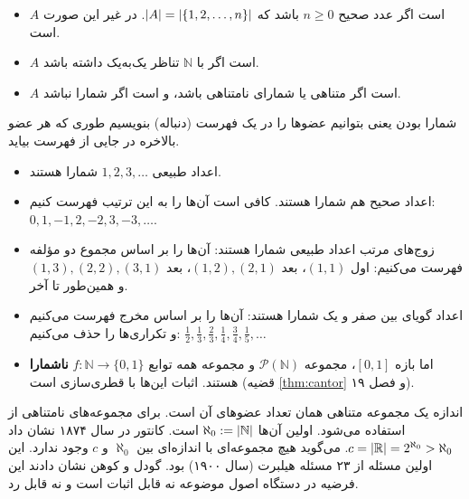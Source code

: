 \begin{definition}
\begin{itemize}
\item $A$  است اگر عدد صحیح $n\ge0$ باشد که $\lvert A\rvert=\lvert \{1,2,\dots,n\}\rvert$. در غیر این صورت  است.
\item $A$  است اگر با $\mathbb{N}$ تناظر یک‌به‌یک داشته باشد.
\item $A$  است اگر متناهی یا شمارای نامتناهی باشد، و  است اگر شمارا نباشد.
\end{itemize}
\end{definition}

شمارا بودن یعنی بتوانیم عضوها را در یک فهرست (دنباله) بنویسیم طوری که هر عضو بالاخره در جایی از فهرست بیاید.

\begin{example}
\begin{itemize}
\item اعداد طبیعی $1,2,3,\dots$ شمارا هستند.
\item اعداد صحیح هم شمارا هستند. کافی است آن‌ها را به این ترتیب فهرست کنیم: $0,1,-1,2,-2,3,-3,\dots$.
\item زوج‌های مرتب اعداد طبیعی شمارا هستند: آن‌ها را بر اساس مجموع دو مؤلفه فهرست می‌کنیم: اول $(1,1)$، بعد $(1,2),(2,1)$، بعد $(1,3),(2,2),(3,1)$ و همین‌طور تا آخر.
\item اعداد گویای بین صفر و یک شمارا هستند: آن‌ها را بر اساس مخرج فهرست می‌کنیم و تکراری‌ها را حذف می‌کنیم: $\tfrac12,\tfrac13,\tfrac23,\tfrac14,\tfrac34,\tfrac15,\dots$
\item اما بازه $[0,1]$، مجموعه $\mathcal{P}(\mathbb{N})$ و مجموعه همه توابع $f:\mathbb{N}\to\{0,1\}$ \textbf{ناشمارا} هستند. اثبات این‌ها با قطری‌سازی است (قضیه \ref{thm:cantor} و فصل ۱۹).
\end{itemize}
\end{example}

\begin{note}
اندازه یک مجموعه متناهی همان تعداد عضوهای آن است. برای مجموعه‌های نامتناهی از  استفاده می‌شود. اولین آن‌ها $\aleph_0:=\lvert \mathbb{N}\rvert$ است. کانتور در سال ۱۸۷۴ نشان داد $c=\lvert \mathbb{R}\rvert=2^{\aleph_0}>\aleph_0$.  می‌گوید هیچ مجموعه‌ای با اندازه‌ای بین $\aleph_0$ و $c$ وجود ندارد. این اولین مسئله از ۲۳ مسئله هیلبرت (سال ۱۹۰۰) بود. گودل و کوهن نشان دادند این فرضیه در دستگاه اصول موضوعه  نه قابل اثبات است و نه قابل رد.
\end{note}

